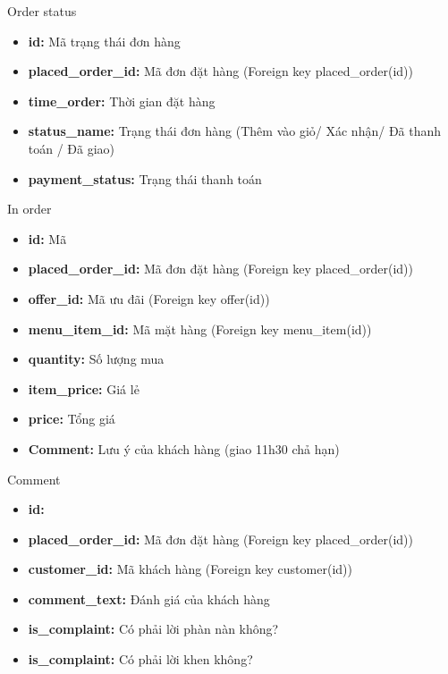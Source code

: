 \documentclass[aspectratio=43,xcolor=dvipsnames]{beamer}
\begin{document}
	\begin{frame}{Order status}
		\begin{itemize}
			\item \textbf{id:} Mã trạng thái đơn hàng
			\item \textbf{placed\_order\_id:} Mã đơn đặt hàng (Foreign key placed\_order(id))
			\item \textbf{time\_order:} Thời gian đặt hàng
			\item \textbf{status\_name:} Trạng thái đơn hàng (Thêm vào giỏ/ Xác nhận/ Đã thanh toán / Đã giao)
			\item \textbf{payment\_status:} Trạng thái thanh toán
		\end{itemize}
	\end{frame}
	
	\begin{frame}{In order}
		\begin{itemize}
			\item \textbf{id:} Mã
			\item \textbf{placed\_order\_id:} Mã đơn đặt hàng (Foreign key placed\_order(id))
			\item \textbf{offer\_id:} Mã ưu đãi (Foreign key offer(id))
			\item \textbf{menu\_item\_id:} Mã mặt hàng (Foreign key menu\_item(id))
			\item \textbf{quantity:} Số lượng mua
			\item \textbf{item\_price:} Giá lẻ
			\item \textbf{price:} Tổng giá
			\item \textbf{Comment:} Lưu ý của khách hàng (giao 11h30 chả hạn)
		\end{itemize}
	\end{frame}
	
	\begin{frame}{Comment}
		\begin{itemize}
			\item \textbf{id:}
			\item \textbf{placed\_order\_id:} Mã đơn đặt hàng (Foreign key placed\_order(id))
			\item \textbf{customer\_id:} Mã khách hàng (Foreign key customer(id))
			\item \textbf{comment\_text:} Đánh giá của khách hàng
			\item \textbf{is\_complaint:} Có phải lời phàn nàn không?
			\item \textbf{is\_complaint:} Có phải lời khen không?
		\end{itemize}
	\end{frame}
\end{document}
